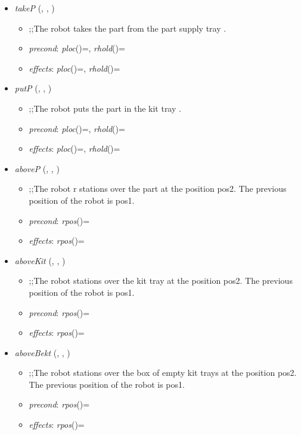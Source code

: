 \begin{itemize}
\item \textit{takeP} (\robot, \parts, \partsup)
\begin{itemize}
\item ;;The robot \robot takes the part \parts from the part supply tray \partsup.
\item \textit{precond}: \textit{ploc}(\parts)=\partsup, \textit{rhold}(\robot)=\nil
\item \textit{effects}: \textit{ploc}(\parts)=\robot, \textit{rhold}(\robot)=\parts
\end{itemize}

\item \textit{putP} (\robot, \parts, \kt)
\begin{itemize}
\item ;;The robot \robot puts the part \parts in the kit tray \kt.
\item \textit{precond}: \textit{ploc}(\parts)=\robot, \textit{rhold}(\robot)=\parts
\item \textit{effects}: \textit{ploc}(\parts)=\kt, \textit{rhold}(\robot)=\nil
\end{itemize}

\item \textit{aboveP} (\parts, {}, {})
\begin{itemize}
\item ;;The robot r stations over the part \parts at the position pos2. The previous position of the robot is pos1.
\item \textit{precond}: \textit{rpos}(\robot)={}
\item \textit{effects}: \textit{rpos}(\robot)={}
\end{itemize}

\item \textit{aboveKit} (\kt, {}, {})
\begin{itemize}
\item ;;The robot \robot stations over the kit tray \kt at the position pos2. The previous position of the robot is pos1.
\item \textit{precond}: \textit{rpos}(\robot)={}
\item \textit{effects}: \textit{rpos}(\robot)={}
\end{itemize}

\item \textit{aboveBekt} (\boxekt, {}, {})
\begin{itemize}
\item ;;The robot \robot stations over the box of empty kit trays at the position pos2. The previous position of the robot is pos1.
\item \textit{precond}: \textit{rpos}(\robot)={}
\item \textit{effects}: \textit{rpos}(\robot)={}
\end{itemize}


\end{itemize}
